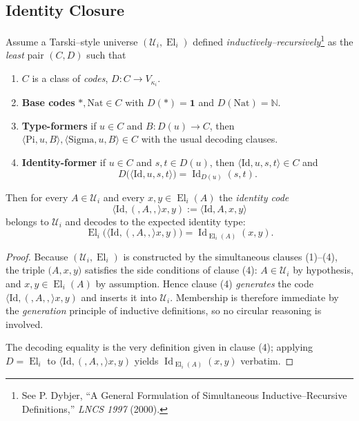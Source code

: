 \documentclass[a4paper,11pt]{article}
\newcommand{\El}{\operatorname{El}}          %
\newcommand{\IdCode}[3]{\langle\mathrm{Id},#1,#2,#3\rangle}
\begin{document}
\subsection{Identity Closure}
\begin{lemma}\label{lem:closure-id}
Assume a Tarski–style universe $(\mathcal U_{i},\El_{i})$
defined \emph{inductively–recursively}\footnote{%
See P. Dybjer, “A General Formulation of Simultaneous
Inductive–Recursive Definitions,” \emph{LNCS 1997} (2000).}
as the \emph{least} pair $(C,D)$ such that

\begin{enumerate}[(1)]
\item $C$ is a class of \emph{codes}, $D\colon C\to V_{\kappa_{i}}$.
\item \textbf{Base codes}\;
      $\ast,\mathrm{Nat}\in C$ with $D(\ast)=\mathbf 1$ and
      $D(\mathrm{Nat})=\mathbb N$.
\item \textbf{Type-formers}\;
      if $u\in C$ and $B\colon D(u)\to C$, then
      $\langle\mathrm{Pi},u,B\rangle,\langle\mathrm{Sigma},u,B\rangle\in C$
      with the usual decoding clauses.
\item \textbf{Identity-former}\;
      if $u\in C$ and $s,t\in D(u)$, then
      $\langle\mathrm{Id},u,s,t\rangle\in C$ and
      \[
        D\!\bigl(\langle\mathrm{Id},u,s,t\rangle\bigr)
            =\operatorname{Id}_{D(u)}(s,t).
      \]
\end{enumerate}

Then for every $A\in\mathcal U_{i}$ and every
$x,y\in\El_{i}(A)$ the \emph{identity code}
\[
  \IdCode(A,x,y)
    :=\langle\mathrm{Id},A,x,y\rangle
\]
belongs to $\mathcal U_{i}$ and decodes to the expected
identity type:
\[
  \El_{i}\!\bigl(\IdCode(A,x,y)\bigr)
    =\operatorname{Id}_{\El_{i}(A)}(x,y).
\]
\end{lemma}

\begin{proof}
Because $(\mathcal U_{i},\El_{i})$ is constructed by the
simultaneous clauses (1)–(4), the triple
$\bigl(A,x,y\bigr)$ satisfies the side conditions of clause (4):
$A\in\mathcal U_{i}$ by hypothesis, and
$x,y\in\El_{i}(A)$ by assumption.
Hence clause (4) \emph{generates} the code
$\IdCode(A,x,y)$ and inserts it into $\mathcal U_{i}$.
Membership is therefore immediate by the \emph{generation} principle
of inductive definitions, so no circular reasoning is involved.

The decoding equality is the very definition given in clause (4);
applying $D=\El_{i}$ to $\IdCode(A,x,y)$ yields
$\operatorname{Id}_{\El_{i}(A)}(x,y)$ verbatim.
\end{proof}
\end{document}
